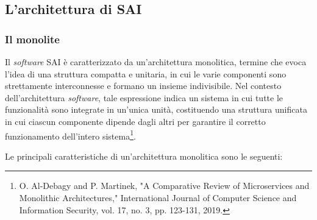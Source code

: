         \subsection{L'architettura di SAI}
        
            \subsubsection{Il monolite}
            
            Il \textit{software} SAI è caratterizzato da un'architettura monolitica, termine che evoca l'idea di una struttura compatta e unitaria, in cui le varie componenti sono strettamente interconnesse e formano un insieme indivisibile. Nel contesto dell'architettura \textit{software}, tale espressione indica un sistema in cui tutte le funzionalità sono integrate in un'unica unità, costituendo una struttura unificata in cui ciascun componente dipende dagli altri per garantire il corretto funzionamento dell'intero sistema\footnote{O. Al-Debagy and P. Martinek, "A Comparative Review of Microservices and Monolithic Architectures," International Journal of Computer Science and Information Security, vol. 17, no. 3, pp. 123-131, 2019.}.  

            \vspace{0.2 em}
            \noindent Le principali caratteristiche di un'architettura monolitica sono le seguenti:  

